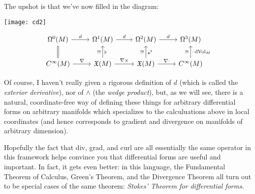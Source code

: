 The upshot is that we've now filled in the diagram:

\ifplastex
	\begin{center}
		\texttt{[image: cd2]}
	\end{center}
\else	
	\[
		\begin{tikzcd}
			\Omega^0(M) \arrow[r,"d"] & \Omega^1(M) \arrow[r,"d"] & \Omega^2(M) \arrow[r,"d"] & \Omega^3(M) \\
			C^\infty(M) \arrow[u, equal] \arrow[r,"\nabla"] & \mathfrak{X}(M) \arrow[u,"\cong","\flat"'] \arrow[r,"\nabla\times"] & \mathfrak{X}(M) \arrow[u,"\cong","\star^\flat"'] \arrow[r,"\nabla \cdot"] & C^\infty(M) \arrow[u,"\cong","\cdot \dVol_M"']
		\end{tikzcd}
	\]
\fi


Of course, I haven't really given a rigorous definition of $d$ (which is called the \emph{exterior derivative}), nor of $\wedge$ (the \emph{wedge product}), but, as we will see, there is a natural, coordinate-free way of defining these things for arbitrary differential forms on arbitrary manifolds which specializes to the calculuations above in local coordinates (and hence corresponds to gradient and divergence on manifolds of arbitrary dimension).

Hopefully the fact that div, grad, and curl are all essentially the same operator in this framework helps convince you that differential forms are useful and important. In fact, it gets even better: in this language, the Fundamental Theorem of Calculus, Green's Theorem, and the Divergence Theorem all turn out to be special cases of the same theorem: \emph{Stokes' Theorem for differential forms}.

